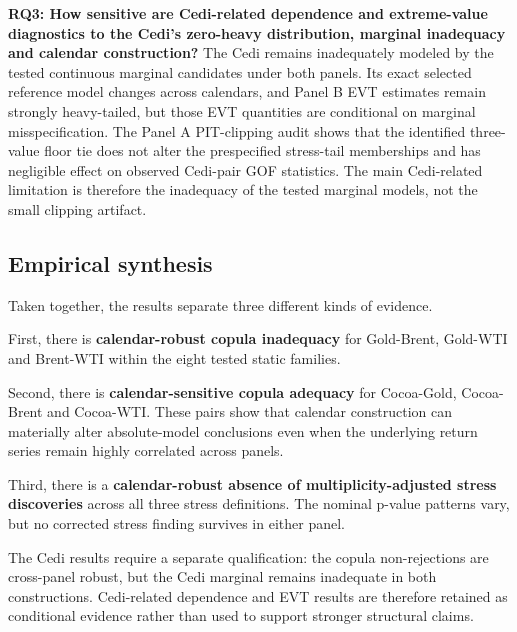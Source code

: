 \textbf{RQ3: How sensitive are Cedi-related dependence and extreme-value diagnostics to the Cedi's zero-heavy distribution, marginal inadequacy and calendar construction?}  
The Cedi remains inadequately modeled by the tested continuous marginal candidates under both panels. Its exact selected reference model changes across calendars, and Panel B EVT estimates remain strongly heavy-tailed, but those EVT quantities are conditional on marginal misspecification. The Panel A PIT-clipping audit shows that the identified three-value floor tie does not alter the prespecified stress-tail memberships and has negligible effect on observed Cedi-pair GOF statistics. The main Cedi-related limitation is therefore the inadequacy of the tested marginal models, not the small clipping artifact.

\subsection{Empirical synthesis}

Taken together, the results separate three different kinds of evidence.

First, there is \textbf{calendar-robust copula inadequacy} for Gold-Brent, Gold-WTI and Brent-WTI within the eight tested static families.

Second, there is \textbf{calendar-sensitive copula adequacy} for Cocoa-Gold, Cocoa-Brent and Cocoa-WTI. These pairs show that calendar construction can materially alter absolute-model conclusions even when the underlying return series remain highly correlated across panels.

Third, there is a \textbf{calendar-robust absence of multiplicity-adjusted stress discoveries} across all three stress definitions. The nominal p-value patterns vary, but no corrected stress finding survives in either panel.

The Cedi results require a separate qualification: the copula non-rejections are cross-panel robust, but the Cedi marginal remains inadequate in both constructions. Cedi-related dependence and EVT results are therefore retained as conditional evidence rather than used to support stronger structural claims.

